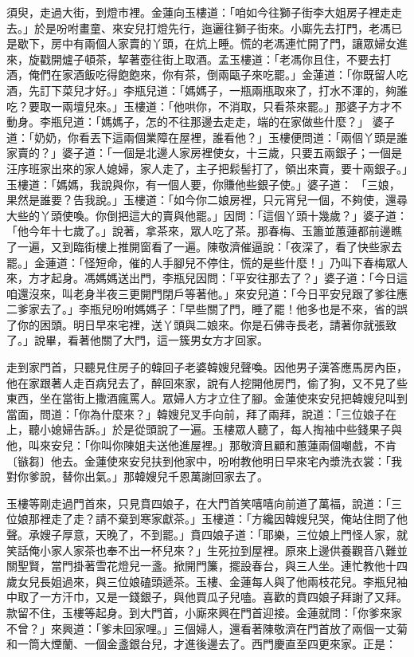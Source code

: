 須臾，走過大街，到燈市裡。金蓮向玉樓道：「咱如今往獅子街李大姐房子裡走走去。」於是吩咐畫童、來安兒打燈先行，迤邐往獅子街來。小廝先去打門，老馮已是歇下，房中有兩個人家賣的丫頭，在炕上睡。慌的老馮連忙開了門，讓眾婦女進來，旋戳開爐子頓茶，挈著壺往街上取酒。孟玉樓道：「老馮你且住，不要去打酒，俺們在家酒飯吃得飽飽來，你有茶，倒兩甌子來吃罷。」金蓮道：「你既留人吃酒，先訂下菜兒才好。」李瓶兒道：「媽媽子，一瓶兩瓶取來了，打水不渾的，夠誰吃？要取一兩壇兒來。」玉樓道：「他哄你，不消取，只看茶來罷。」那婆子方才不動身。李瓶兒道：「媽媽子，怎的不往那邊去走走，端的在家做些什麼？」 婆子道：「奶奶，你看丟下這兩個業障在屋裡，誰看他？」玉樓便問道：「兩個丫頭是誰家賣的？」婆子道：「一個是北邊人家房裡使女，十三歲，只要五兩銀子；一個是汪序班家出來的家人媳婦，家人走了，主子把鬏髻打了，領出來賣，要十兩銀子。」玉樓道：「媽媽，我說與你，有一個人要，你賺他些銀子使。」婆子道： 「三娘，果然是誰要？告我說。」玉樓道：「如今你二娘房裡，只元宵兒一個，不夠使，還尋大些的丫頭使喚。你倒把這大的賣與他罷。」因問：「這個丫頭十幾歲？」婆子道：「他今年十七歲了。」說著，拿茶來，眾人吃了茶。那春梅、玉簫並蕙蓮都前邊瞧了一遍，又到臨街樓上推開窗看了一遍。陳敬濟催逼說：「夜深了，看了快些家去罷。」金蓮道：「怪短命，催的人手腳兒不停住，慌的是些什麼！」乃叫下春梅眾人來，方才起身。馮媽媽送出門，李瓶兒因問：「平安往那去了？」婆子道：「今日這咱還沒來，叫老身半夜三更開門閉戶等著他。」來安兒道：「今日平安兒跟了爹往應二爹家去了。」李瓶兒吩咐媽媽子：「早些關了門，睡了罷！他多也是不來，省的誤了你的困頭。明日早來宅裡，送丫頭與二娘來。你是石佛寺長老，請著你就張致了。」說畢，看著他關了大門，這一簇男女方才回家。

走到家門首，只聽見住房子的韓回子老婆韓嫂兒聲喚。因他男子漢答應馬房內臣，他在家跟著人走百病兒去了，醉回來家，說有人挖開他房門，偷了狗，又不見了些東西，坐在當街上撒酒瘋罵人。眾婦人方才立住了腳。金蓮使來安兒把韓嫂兒叫到當面，問道：「你為什麼來？」韓嫂兒叉手向前，拜了兩拜，說道：「三位娘子在上，聽小媳婦告訴。」於是從頭說了一遍。玉樓眾人聽了，每人掏袖中些錢果子與他，叫來安兒：「你叫你陳姐夫送他進屋裡。」那敬濟且顧和蕙蓮兩個嘲戲，不肯〔镞芻〕他去。金蓮使來安兒扶到他家中，吩咐教他明日早來宅內漿洗衣裳：「我對你爹說，替你出氣。」那韓嫂兒千恩萬謝回家去了。

玉樓等剛走過門首來，只見賁四娘子，在大門首笑嘻嘻向前道了萬福，說道：「三位娘那裡走了走？請不棄到寒家獻茶。」玉樓道：「方纔因韓嫂兒哭，俺站住問了他聲。承嫂子厚意，天晚了，不到罷。」賁四娘子道：「耶樂，三位娘上門怪人家，就笑話俺小家人家茶也奉不出一杯兒來？」生死拉到屋裡。原來上邊供養觀音八難並關聖賢，當門掛著雪花燈兒一盞。掀開門簾，擺設春台，與三人坐。連忙教他十四歲女兒長姐過來，與三位娘磕頭遞茶。玉樓、金蓮每人與了他兩枝花兒。李瓶兒袖中取了一方汗巾，又是一錢銀子，與他買瓜子兒嗑。喜歡的賁四娘子拜謝了又拜。款留不住，玉樓等起身。到大門首，小廝來興在門首迎接。金蓮就問：「你爹來家不曾？」來興道：「爹未回家哩。」三個婦人，還看著陳敬濟在門首放了兩個一丈菊和一筒大煙蘭、一個金盞銀台兒，才進後邊去了。西門慶直至四更來家。正是：


